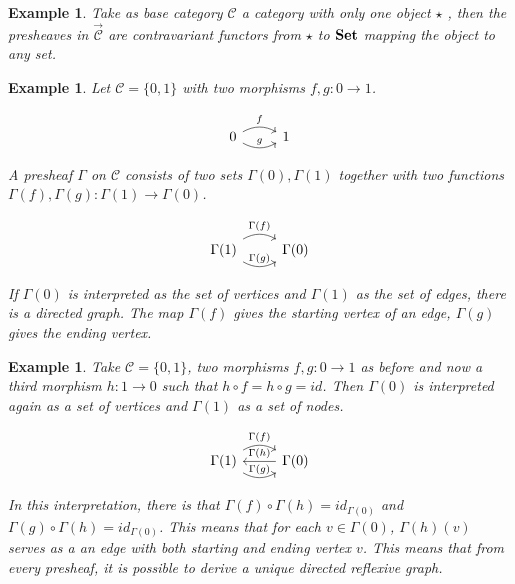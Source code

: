 \documentclass[12pt,a4paper,twoside,xetex]{book} %
\newcommand{\keyword}[1]{\emph{#1}\index{#1}}
\newtheorem{example}[theorem]{Example}
\newcommand{\psh}[1]{\overrightarrow{#1}}
\begin{document}
\begin{example}
Take as base category $\mathcal{C}$ a category with only one object 
$\star$ , then the presheaves in $\psh{\mathcal{C}}$ are contravariant functors 
from $\star$ to $\text{\textbf{Set}}$ mapping the object to any set. 

\end{example}

\begin{example}

Let $\mathcal{C} = \{0,1\}$ with two morphisms $f,g:0\rightarrow 1$. 

\[ \begin{tikzcd}
0 \arrow[r, bend left, "f"] \arrow[r, bend right, "g"] & 1
\end{tikzcd} \]


A presheaf $\Gamma$ on $\mathcal{C}$ consists of two sets $\Gamma (0), \Gamma 
(1)$ together with two functions $\Gamma (f),\Gamma (g):\Gamma (1) \rightarrow 
\Gamma (0)$.

\[ \begin{tikzcd}
\Gamma (1)
\arrow[r, bend left, "\Gamma (f)"] 
\arrow[r, bend right, "\Gamma (g)"] 
& \Gamma(0) 
\end{tikzcd} \]

 If $\Gamma (0)$ is interpreted as the set of vertices and $\Gamma (1)$ as the 
set of edges, there is a directed graph. The map $\Gamma (f)$ gives the starting 
vertex of an edge, $\Gamma (g)$ gives the ending vertex. 
\end{example}

\begin{example} \label{reflgraph}
Take $\mathcal{C} = \{0,1\}$, two morphisms $f,g:0\rightarrow 1$ as before and 
now a third morphism $h: 1 \rightarrow 0$ such that $h \circ f = h \circ g = 
id$. Then $\Gamma (0)$ is interpreted again as a set of vertices and $\Gamma (1)$ 
as a set of nodes.

\[ \begin{tikzcd}
\Gamma (1)
\arrow[r, bend left, "\Gamma (f)"] 
\arrow[r, bend right, "\Gamma (g)"] 
& \Gamma(0) 
\arrow[l, "\Gamma (h)"{above}]
\end{tikzcd} \]

In this interpretation, there is that $\Gamma (f) \circ \Gamma (h) = id_{\Gamma 
(0)}$ and $\Gamma (g) \circ \Gamma (h) = id_{\Gamma(0)}$. This means that for 
each $v \in \Gamma (0)$, $\Gamma (h) (v)$ serves as a an edge with both 
starting and ending vertex $v$. This means that from every presheaf, it is 
possible to derive a unique \keyword{directed reflexive graph}. 
\end{example}
\end{document}
